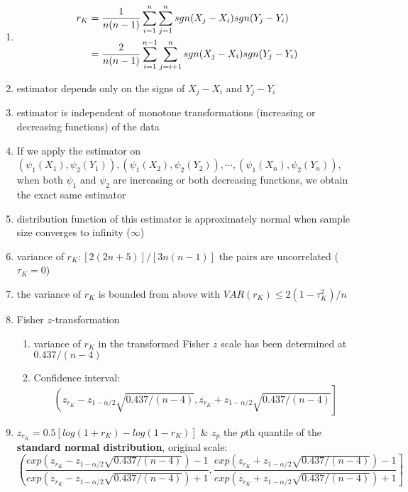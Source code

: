 \begin{enumerate}
    \item[] \begin{align*}
        r_K
        &= \dfrac{1}{n(n-1)} \displaystyle\sum_{i=1}^n \displaystyle\sum_{j=1}^n
            sgn(X_j - X_i)sgn(Y_j - Y_i) \\
        &= \dfrac{2}{n(n-1)} \displaystyle\sum_{i=1}^{n-1} \displaystyle\sum_{j=i+1}^n sgn(X_j - X_i)sgn(Y_j - Y_i)
    \end{align*}

    \item estimator depends only on the signs of $X_j - X_i$ and $Y_j - Y_i$

    \item estimator is independent of monotone transformations (increasing or decreasing functions) of the data

    \item If we apply the estimator on $(\psi_1(X_1), \psi_2(Y_1)), (\psi_1(X_2), \psi_2(Y_2)), \cdots , (\psi_1(X_n), \psi_2(Y_n))$, when both $\psi_1$ and $\psi_2$ are increasing or both decreasing functions, we obtain the exact same estimator

    \item distribution function of this estimator is approximately normal when sample size converges to infinity ($\infty$)

    \item variance of $r_K : [2(2n + 5)]/[3n(n - 1)]$  the pairs are uncorrelated ($\tau_K = 0$)

    \item the variance of $r_K$ is bounded from above with $VAR(r_K) \leq 2(1 - \tau_K^2)/n$

    \item Fisher $z$-transformation
    \begin{enumerate}
        \item variance of $r_K$ in the transformed Fisher $z$ scale has been determined at $0.437/(n - 4)$

        \item Confidence interval:
        \[\left(
            z_{r_K} - z_{1-\alpha/2}\sqrt{0.437/(n - 4)},
            z_{r_K} + z_{1-\alpha/2}\sqrt{0.437/(n - 4)}
        \right]\]

    \end{enumerate}

    \item $z_{r_K} = 0.5[log(1 + r_K) - log(1 - r_K)]$ \& $z_p$ the $p$th quantile of the \textbf{standard normal distribution}, original scale:
    \[\left(
        \dfrac{
            exp(z_{r_K} - z_{1-\alpha/2}\sqrt{0.437/(n - 4)}) - 1
        }{
            exp(z_{r_K} - z_{1-\alpha/2}\sqrt{0.437/(n - 4)}) + 1
        },
        \dfrac{
            exp(z_{r_K} + z_{1-\alpha/2}\sqrt{0.437/(n - 4)}) - 1
        }{
            exp(z_{r_K} + z_{1-\alpha/2}\sqrt{0.437/(n - 4)}) + 1
        }
    \right]\]

    
\end{enumerate}



